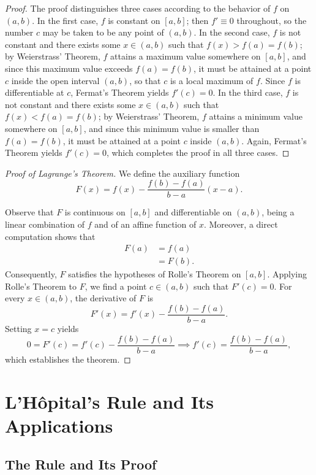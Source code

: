 \begin{proof}
The proof distinguishes three cases according to the behavior of $f$ on $(a,b)$. In the first case, $f$ is constant on $[a,b]$; then $f' \equiv 0$ throughout, so the number $c$ may be taken to be any point of $(a,b)$. In the second case, $f$ is not constant and there exists some $x \in (a,b)$ such that $f(x) > f(a) = f(b)$; by Weierstrass' Theorem, $f$ attains a maximum value somewhere on $[a,b]$, and since this maximum value exceeds $f(a) = f(b)$, it must be attained at a point $c$ inside the open interval $(a,b)$, so that $c$ is a local maximum of $f$. Since $f$ is differentiable at $c$, Fermat's Theorem yields $f'(c) = 0$. In the third case, $f$ is not constant and there exists some $x \in (a,b)$ such that $f(x) < f(a) = f(b)$; by Weierstrass' Theorem, $f$ attains a minimum value somewhere on $[a,b]$, and since this minimum value is smaller than $f(a) = f(b)$, it must be attained at a point $c$ inside $(a,b)$. Again, Fermat's Theorem yields $f'(c) = 0$, which completes the proof in all three cases.
\end{proof}

\begin{proof}[Proof of Lagrange's Theorem]
We define the auxiliary function
\[
F(x) = f(x) - \frac{f(b) - f(a)}{b - a} (x - a).
\]

Observe that $F$ is continuous on $[a,b]$ and differentiable on $(a,b)$, being a linear combination of $f$ and of an affine function of $x$. Moreover, a direct computation shows that
\[
\begin{aligned}
F(a) &= f(a) \\
&= F(b).
\end{aligned}
\]
Consequently, $F$ satisfies the hypotheses of Rolle's Theorem on $[a,b]$. Applying Rolle's Theorem to $F$, we find a point $c \in (a,b)$ such that $F'(c) = 0$. For every $x \in (a,b)$, the derivative of $F$ is
\[
F'(x) = f'(x) - \frac{f(b) - f(a)}{b-a}.
\]
Setting $x = c$ yields
\[
0 = F'(c) = f'(c) - \frac{f(b) - f(a)}{b-a} \implies f'(c) = \frac{f(b) - f(a)}{b-a},
\]
which establishes the theorem.
\end{proof}



\section{L'H\^opital's Rule and Its Applications}

\subsection{The Rule and Its Proof}

